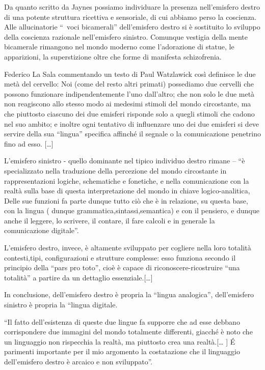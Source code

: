 Da quanto scritto da Jaynes possiamo individuare la presenza nell’emisfero destro
di una potente struttura ricettiva e  sensoriale, di cui abbiamo perso la
coscienza. Alle allucinatorie  “ voci bicamerali”  dell’emisfero destro si è
sostituito lo sviluppo della coscienza razionale  nell’emisfero sinistro. Comunque
vestigia della mente bicamerale rimangono nel mondo moderno come  l’adorazione
di statue, le apparizioni, la superstizione oltre che forme di manifesta
schizofrenia.

Federico La Sala  commentando  un  testo di Paul Watzlawick così definisce
le due metà del cervello: Noi (come del resto altri primati) possediamo due
cervelli che possono funzionare  indipendentemente l’uno dall’altro; che non
solo le due metà non reagiscono  allo stesso modo ai medesimi stimoli  del mondo
circostante, ma che piuttosto ciascuno dei due emisferi  risponde solo a quegli
stimoli  che cadono nel suo ambito; e inoltre ogni tentativo  di influenzare uno
dei due emisferi  si deve servire della sua “lingua” specifica affinché il
segnale o la comunicazione penetrino fino ad esso. […]

L’emisfero sinistro - quello dominante nel tipico individuo destro rimane – “è
specializzato nella traduzione  della percezione del mondo circostante  in
rappresentazioni logiche, schematiche e fonetiche, e nella comunicazione  con la
realtà  sulla base di questa interpretazione del mondo in chiave logico-analitica,
Delle  sue funzioni fa parte dunque tutto ciò che è in relazione, su questa base,
con la lingua ( dunque grammatica,sintassi,semantica) e con il pensiero, e dunque
anche il leggere, lo scrivere, il contare, il fare calcoli e in generale la
comunicazione digitale”.

L’emisfero destro, invece, è altamente sviluppato per cogliere  nella loro
totalità contesti,tipi, configurazioni e strutture complesse: esso funziona
secondo il principio della “pars pro toto”, cioè  è capace di
riconoscere-ricostruire “una totalità” a partire da un dettaglio essenziale.[…]

In  conclusione, dell’emisfero destro è propria la “lingua analogica”,
dell’emisfero sinistro  è propria la “lingua digitale.

“Il fatto dell’esistenza di queste due lingue  fa supporre che ad esse debbano
corrispondere due immagini del mondo totalmente differenti, giacché è noto  che
un linguaggio non rispecchia la realtà, ma piuttosto crea una realtà.[… ] É
parimenti importante  per il mio argomento la costatazione che il linguaggio
dell’emisfero destro è arcaico e non sviluppato”.

